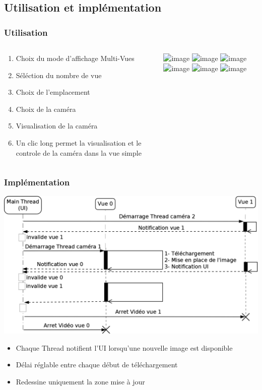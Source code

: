   \subsection{Utilisation et implémentation}
  \begin{frame}
   \frametitle{Utilisation}

\begin{columns}
\begin{column}{7cm}
\begin{enumerate}[<+->]
    \item Choix du mode d'affichage Multi-Vues
    \item Séléction du nombre de vue
  	\item Choix de l'emplacement
  	\item Choix de la caméra
  	\item Visualisation de la caméra
  	\item Un clic long permet la visualisation et le controle de la caméra dans
  	la vue simple
\end{enumerate}
\end{column}
\begin{column}{6cm}
  \centering \includegraphics<1>[width=3cm]{Images/mvstep/s1.jpg}
  \centering \includegraphics<2>[width=3cm]{Images/mvstep/s2.jpg}
  \centering\includegraphics<3>[width=5cm]{Images/mvstep/s3.jpg}
  \centering \includegraphics<4>[width=5cm]{Images/mvstep/s4.jpg}
  \centering \includegraphics<5>[width=5cm]{Images/mvstep/s5.jpg}
  \centering \includegraphics<6>[width=5cm]{Images/mvstep/s6.jpg}
\end{column}
\end{columns}

  \end{frame}
 
  \begin{frame}
   \frametitle{Implémentation}
\centering \includegraphics[scale=0.2]{Images/DiagrammeSequenceMultiView.png}

\begin{itemize}
    \item Chaque Thread notifient l'UI lorsqu'une nouvelle image est
    disponible
  	\item Délai réglable entre chaque début de téléchargement
  	\item Redessine uniquement la zone mise à jour
\end{itemize}
 \end{frame}
  